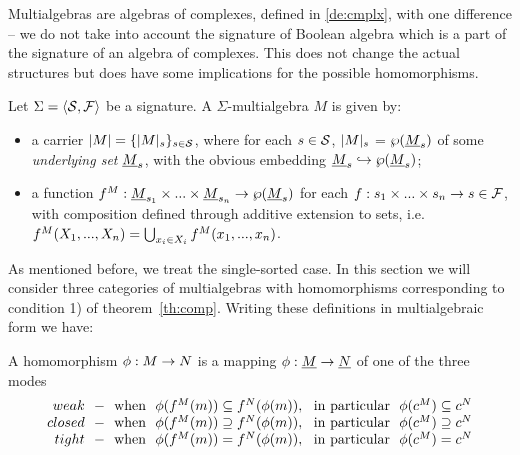 \documentclass[10pt]{article}
\begin{document}
Multialgebras are algebras of complexes, defined in \ref{de:cmplx}, with one
difference -- we do not take into account the signature of Boolean algebra
which is a part of the signature of an algebra of complexes. This does not
change the actual structures but does have some implications for the
possible homomorphisms.
%
\begin{Definition}\label{de:multi}
Let $\Sigma = \langle {\cal S},{\cal F}\rangle$ be a signature. A $\Sigma$-multialgebra $M$
is given by:
\begin{itemize}
\item 
a carrier $|M|=\{|M|_s\}_{s\in {\cal S}}$, where for each $s\in
{\cal S}$, $|M|_s$ = $\wp(\underline {M}_s)$ of some {\em underlying set}
$\underline {M}_s$, with the obvious embedding $\underline {M}_s\hookrightarrow \wp(\underline {M}_s)$;
\item 
a function $f^M:\underline {M}_{s_1}\times...\times \underline {M}_{s_n}\rightarrow
\wp(\underline {M}_s)$ for each $f:s_1\times...\times s_n\rightarrow s\in {\cal F}$,
with composition defined through additive extension to sets, i.e.\
 $f^M(X_1,...,X_n) = \bigcup_{x_i\in X_i} f^M(x_1,...,x_n)$.
\end{itemize}
\end{Definition}
%
As mentioned before, we treat the single-sorted case.
In this section we will consider three categories of multialgebras
with homomorphisms corresponding to condition 1) of
theorem~\ref{th:comp}. Writing these definitions in multialgebraic
form we have:

\begin{Definition}
A homomorphism $\phi:M\rightarrow N$ is a mapping $\phi: \underline {M}\rightarrow \underline {N}$ of one of the three modes 
\[
\begin{array}{r@{\ \ -\ \ {\rm when\ \ }}l@{,\ \ {\rm in\ particular\ \ }}l}
{\sl weak} & \phi(f^M( m))\subseteq f^N(\phi( m)) & \phi(c^M)\subseteq c^N \\
{\sl closed}& \phi(f^M( m))\supseteq f^N(\phi( m))  & \phi(c^M)\supseteq c^N \\
{\sl tight} & \phi(f^M( m))= f^N(\phi( m))  & \phi(c^M)= c^N 
\end{array} 
\]
\end{Definition}
%
\end{document}
